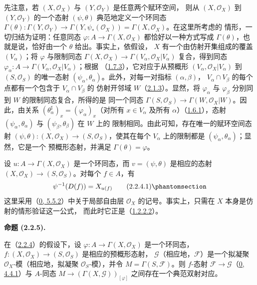 \documentclass[UTF8,fontset=none,11pt,oneside,openany]{ctexbook}
\newenvironment{proposition}[1][]{%
  \par\medskip\noindent\textbf{命题 (#1).}\ %
}{\par}
\newcommand{\oldpage}[2][]{%
  \hypertarget{ega-source-page-#1-#2}{}%
  \marginnote{\scriptsize\textbf{#1}~|~#2}\ignorespaces}
\let\EGAOriginalLabel\label
\renewcommand{\label}[1]{\phantomsection\EGAOriginalLabel{#1}}
\begin{document}
先注意，若 $(X,\mathscr{O}_X)$ 与 $(Y,\mathscr{O}_Y)$ 是任意两个赋环空间，
则从 $(X,\mathscr{O}_X)$ 到 $(Y,\mathscr{O}_Y)$ 的一个态射
$(\psi,\theta)$ 典范地定义一个环同态
$\Gamma(\theta):\Gamma(Y,\mathscr{O}_Y)\to
\Gamma(Y,\psi_*(\mathscr{O}_X))=\Gamma(X,\mathscr{O}_X)$。在这里所考虑的
情形，一切归结为证明：任意同态
$\varphi:A\to\Gamma(X,\mathscr{O}_X)$ 都恰好以一种方式写成
$\Gamma(\theta)$，也就是说，恰好由一个 $\theta$ 给出。事实上，依假设，
$X$ 有一个由仿射开集组成的覆盖
$(V_\alpha)$；将 $\varphi$ 与限制同态
$\Gamma(X,\mathscr{O}_X)\to
\Gamma(V_\alpha,\mathscr{O}_X|V_\alpha)$ 复合，得到同态
$\varphi_\alpha:A\to\Gamma(V_\alpha,\mathscr{O}_X|V_\alpha)$；根据
（\hyperref[I.1.7.3-fr]{1.7.3}），它对应于从预概形
$(V_\alpha,\mathscr{O}_X|V_\alpha)$ 到 $(S,\mathscr{O}_S)$ 的唯一态射
$(\psi_\alpha,\theta_\alpha)$。此外，对每一对指标 $(\alpha,\beta)$，
$V_\alpha\cap V_\beta$ 的每个点都有一个包含于 $V_\alpha\cap V_\beta$ 的
仿射开邻域 $W$（\hyperref[I.2.1.3-fr]{2.1.3}）。显然，将
$\varphi_\alpha$ 与 $\varphi_\beta$ 分别同到 $W$ 的限制同态复合，所得的是
同一个同态
$\Gamma(S,\mathscr{O}_S)\to\Gamma(W,\mathscr{O}_X|W)$。因此，由关系
$(\theta_\alpha^\sharp)_x=(\varphi_\alpha)_x$（对所有 $x\in V_\alpha$
及所有 $\alpha$）（\hyperref[I.1.6.1-fr]{1.6.1}），态射
$(\psi_\alpha,\theta_\alpha)$ 与 $(\psi_\beta,\theta_\beta)$ 在 $W$ 上的
限制相同。由此可知，存在唯一的赋环空间态射
$(\psi,\theta):(X,\mathscr{O}_X)\to(S,\mathscr{O}_S)$，使其在每个
$V_\alpha$ 上的限制都是 $(\psi_\alpha,\theta_\alpha)$；显然，它是一个
预概形态射，并满足 $\Gamma(\theta)=\varphi$。

设 $u:A\to\Gamma(X,\mathscr{O}_X)$ 是一个环同态，而
$v=(\psi,\theta)$ 是相应的态射
$(X,\mathscr{O}_X)\to(S,\mathscr{O}_S)$。对每个 $f\in A$，有
\begin{equation}
  \psi^{-1}(D(f))=X_{u(f)}
  \tag{2.2.4.1}\label{I.2.2.4.1-fr}
\end{equation}
这里采用（\hyperref[0.5.5.2-fr]{0, 5.5.2}）中关于局部自由层
$\mathscr{O}_X$ 的记号。事实上，只需在 $X$ 本身是仿射的情形验证这一公式，
而此时它正是（\hyperref[I.1.2.2.2-fr]{1.2.2.2}）。

\begin{proposition}[2.2.5]
\label{I.2.2.5-fr}
在（\hyperref[I.2.2.4-fr]{2.2.4}）的假设下，设
$\varphi:A\to\Gamma(X,\mathscr{O}_X)$ 是一个环同态，
$f:(X,\mathscr{O}_X)\to(S,\mathscr{O}_S)$ 是相应的预概形态射，
$\mathscr{G}$（相应地，$\mathscr{F}$）是一个拟凝聚
$\mathscr{O}_X$-模（相应地，拟凝聚 $\mathscr{O}_S$-模），并令
$M=\Gamma(S,\mathscr{F})$。则 $f$-态射
\oldpage[I]{100}
$\mathscr{F}\to\mathscr{G}$（\hyperref[0.4.4.1-fr]{0, 4.4.1}）与
$A$-同态 $M\to(\Gamma(X,\mathscr{G}))_{[\varphi]}$ 之间存在一个典范双射对应。
\end{proposition}
\end{document}
